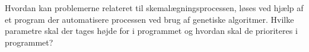Hvordan kan problemerne relateret til skemalægningsprocessen, løses ved hjælp af et program der automatisere processen ved brug af genetiske algoritmer. Hvilke parametre skal der tages højde for i programmet og hvordan skal de prioriteres i programmet?
\newpage
